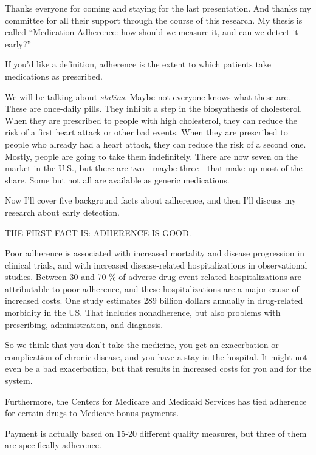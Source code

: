 \documentclass[12pt]{report}
\begin{document}
\begin{large}
Thanks everyone for coming and staying for the last presentation. And
thanks my committee for all their support through the course of this
research. My thesis is called ``Medication Adherence: how should we
measure it, and can we detect it early?'' %

If you'd like a definition, adherence is the extent to which patients
take medications as prescribed. 

We will be talking about \emph{statins.} Maybe not everyone knows what
these are. These are once-daily pills. They inhibit a step in the
biosynthesis of cholesterol. When they are prescribed to people with
high cholesterol, they can reduce the risk of a first heart attack or
other bad events. When they are prescribed to people who already had a
heart attack, they can reduce the risk of a second one. Mostly, people
are going to take them indefinitely. There are now seven on the market
in the U.S., but there are two---maybe three---that make up most of
the share. Some but not all are available as generic medications.

Now I'll cover five background facts about adherence, and then I'll
discuss my research about early detection.

THE FIRST FACT IS: ADHERENCE IS GOOD. %

Poor adherence is associated with increased mortality and disease
progression in clinical trials, and with increased disease-related
hospitalizations in observational studies. Between 30 and 70 \% of
adverse drug event-related hospitalizations are attributable to poor
adherence, and these hospitalizations are a major cause of increased
costs. One study estimates 289 billion dollars annually in
drug-related morbidity in the US. That includes nonadherence, but also
problems with prescribing, administration, and diagnosis. %
\end{large}

So we think that you don't take the medicine, you get an exacerbation
or complication of chronic disease, and you have a stay in the
hospital. It might not even be a bad exacerbation, but that results in
increased costs for you and for the system.

\begin{large}
Furthermore, the Centers for Medicare and Medicaid Services has tied
adherence for certain drugs to Medicare bonus payments. %
\end{large}

Payment is actually based on 15-20 different quality measures, but
three of them are specifically adherence.
\end{document}
